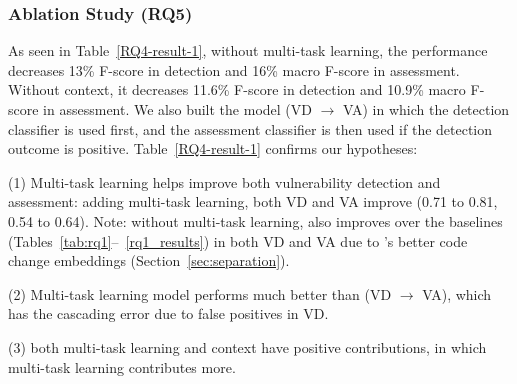 \subsubsection{\bf Ablation Study (RQ5)}




As seen in Table~\ref{RQ4-result-1}, without multi-task learning, the
performance decreases 13\% F-score in detection and 16\% macro F-score
in assessment. Without context, it decreases 11.6\% F-score in
detection and 10.9\% macro F-score in assessment. We also built the
model (VD $\rightarrow$ VA) in which the detection classifier is used
first, and the assessment classifier is then used if the detection
outcome is positive. Table~\ref{RQ4-result-1} confirms our
hypotheses:

(1) Multi-task learning helps improve both vulnerability detection and
assessment: adding multi-task learning, both VD and VA improve (0.71
to 0.81, 0.54 to 0.64). Note: without multi-task learning, {\tool}
also improves over the baselines (Tables~\ref{tab:rq1}--~\ref{rq1_results}) in both VD and VA due to {\tool}'s better code
change embeddings (Section~\ref{sec:separation}).

(2) Multi-task learning model performs much better than
(VD $\rightarrow$ VA), which has the cascading error due to
false positives in VD.

(3) both multi-task learning and context have positive contributions,
in which multi-task learning contributes more.






